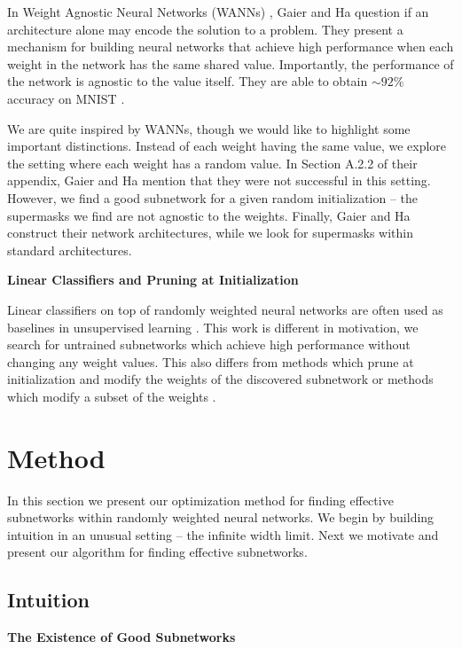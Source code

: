 \documentclass[10pt,twocolumn,letterpaper]{article}
\begin{document}
In Weight Agnostic Neural Networks (WANNs) \cite{wann2019}, Gaier and Ha question if an architecture alone may encode the solution to a problem. They present a mechanism for building neural networks that achieve high performance when each weight in the network has the same shared value. Importantly, the performance of the network is agnostic to the value itself. They are able to obtain $\sim 92\%$ accuracy on MNIST \cite{mnist}.

We are quite inspired by WANNs, though we would like to highlight some important distinctions. Instead of each weight having the same value, we explore the setting where each weight has a random value. In Section A.2.2 of their appendix, Gaier and Ha mention that they were not successful in this setting. However, we find a good subnetwork for a given random initialization -- the supermasks we find are not agnostic to the weights. Finally, Gaier and Ha construct their network architectures, while we look for supermasks within standard architectures.

\noindent\textbf{Linear Classifiers and Pruning at Initialization}

Linear classifiers on top of randomly weighted neural networks are often used as baselines in unsupervised learning \cite{jigsaw, elm}. This work is different in motivation, we search for untrained subnetworks which achieve high performance without changing any weight values. This also differs from methods which prune at initialization and modify the weights of the discovered subnetwork \cite{lee2018snip, lee2019signal} or methods which modify a subset of the weights \cite{rosenfeld2019intriguing}.

\section{Method}

In this section we present our optimization method for finding effective subnetworks within randomly weighted neural networks. We begin by building intuition in an unusual setting -- the infinite width limit. Next we motivate and present our algorithm for finding effective subnetworks.

\subsection{Intuition} \label{sec:int}

\noindent \textbf{The Existence of Good Subnetworks} 
\end{document}

